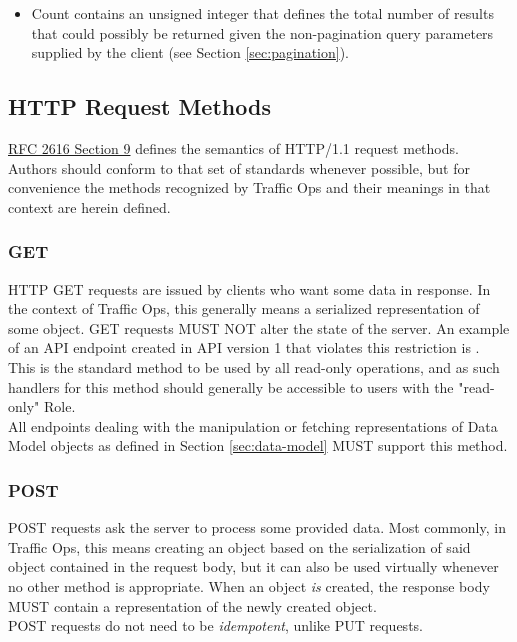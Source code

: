\begin{itemize}
	\item {} Count contains an unsigned integer that defines the total
		number of results that could possibly be returned given the
		non-pagination query parameters supplied by the client (see Section
		\ref{sec:pagination}).
\end{itemize}

\subsection{HTTP Request Methods}
\href{https://tools.ietf.org/html/rfc2616#section-9}{RFC 2616 Section 9} defines the semantics of HTTP/1.1 request methods. Authors should conform
to that set of standards whenever possible, but for convenience the methods recognized by Traffic Ops and their meanings in that context are
herein defined.

\subsubsection{GET}
HTTP GET requests are issued by clients who want some data in response. In the context of Traffic Ops, this generally means a serialized
representation of some object. GET requests MUST NOT alter the state of the server. An example of an API endpoint created in API version 1
that violates this restriction is .\\
This is the standard method to be used by all read-only operations, and as such handlers for this method should generally be accessible to
users with the "read-only" Role.\\
All endpoints dealing with the manipulation or fetching representations of Data Model objects as defined in Section \ref{sec:data-model}
MUST support this method.

\subsubsection{POST}
POST requests ask the server to process some provided data. Most commonly, in Traffic Ops, this means creating an object based on the serialization
of said object contained in the request body, but it can also be used virtually whenever no other method is appropriate. When an object \emph{is}
created, the response body MUST contain a representation of the newly created object.\\
POST requests do not need to be \emph{idempotent}, unlike PUT requests.

